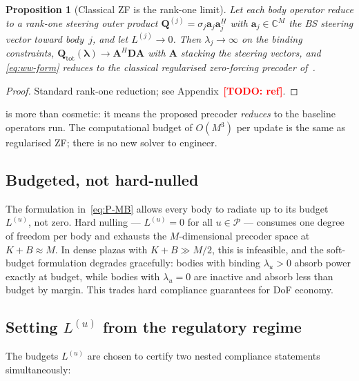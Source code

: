 \documentclass[journal,twoside,onecolumn]{IEEEtran}
\newtheorem{proposition}[theorem]{Proposition}
\theoremstyle{definition}
\newcommand{\TODO}[1]{\textcolor{red}{\textbf{[TODO: #1]}}}
\newcommand{\avec}{\mathbf{a}}
\newcommand{\Q}{\mathbf{Q}}
\newcommand{\Complex}{\mathbb{C}}
\newcommand{\AllBodies}{\mathcal{P}}
\begin{document}
\begin{proposition}[Classical ZF is the rank-one limit]\label{prop:ZF}
Let each body operator reduce to a rank-one steering outer product
$\Q^{(j)}=\sigma_j\avec_j\avec_j^H$ with $\avec_j\in\Complex^M$ the
BS steering vector toward body~$j$, and let
$L^{(j)}\to 0$. Then $\lambda_j\to\infty$ on the binding constraints,
$\Q_{\mathrm{tot}}(\bm\lambda)\to \mathbf{A}^H\mathbf{D}\mathbf{A}$
with $\mathbf{A}$ stacking the steering vectors, and
\eqref{eq:ww-form} reduces to the classical regularised
zero-forcing precoder of~\cite{PeelHochwald2005}.
\end{proposition}

\begin{proof}
Standard rank-one reduction; see Appendix~\TODO{ref}.
\end{proof}

 is more than cosmetic: it means the proposed
precoder \emph{reduces} to the baseline operators run. The
computational budget of $O(M^3)$ per update is the same as
regularised ZF; there is no new solver to engineer.

\subsection{Budgeted, not hard-nulled}

The formulation in~\eqref{eq:P-MB} allows every body to radiate up
to its budget $L^{(u)}$, not zero. Hard nulling --- $L^{(u)}=0$
for all $u\in\AllBodies$ --- consumes one degree of freedom per
body and exhausts the $M$-dimensional precoder space at
$K+B\approx M$. In dense plazas with $K+B\gg M/2$, this is
infeasible, and the soft-budget formulation degrades gracefully:
bodies with binding $\lambda_u>0$ absorb power exactly at budget,
while bodies with $\lambda_u=0$ are inactive and absorb less than
budget by margin. This trades hard compliance guarantees for DoF
economy.

\subsection{Setting $L^{(u)}$ from the regulatory regime}

The budgets $L^{(u)}$ are chosen to certify two nested compliance
statements simultaneously:
\end{document}

